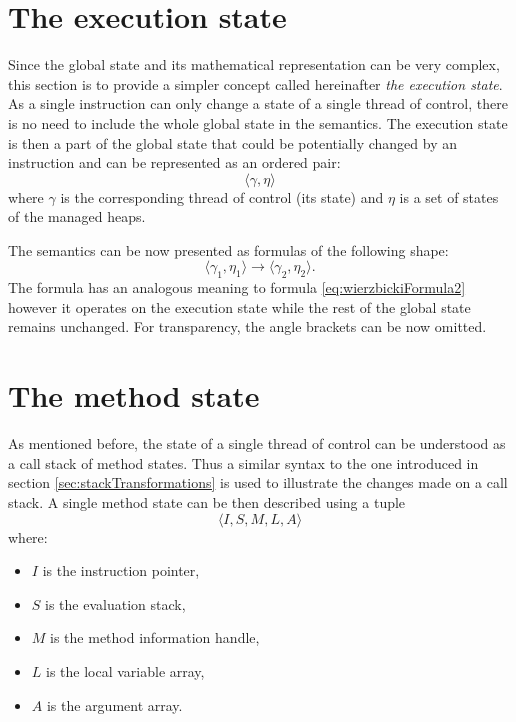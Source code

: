 \documentclass[declaration,shortabstract,english,mgr]{iithesis}
\newcommand{\mstate}[5] {
	\langle#1, #2, #3, #4, #5\rangle
}
\begin{document}
\section{The execution state}
\label{sec:executionState}

Since the global state and its mathematical representation can be very complex, this section is to provide a simpler concept called hereinafter \textit{the execution state}. As a single instruction can only change a state of a single thread of control, there is no need to include the whole global state in the semantics. The execution state is then a part of the global state that could be potentially changed by an instruction and can be represented as an ordered pair:
\begin{equation}
\label{eq:executionState}
	\langle\gamma, \eta\rangle
\end{equation}
where $\gamma$ is the corresponding thread of control (its state) and $\eta$ is a set of states of the managed heaps.

The semantics can be now presented as formulas of the following shape:
\begin{equation}
\label{eq:simpleSemantics}
	\langle\gamma_1, \eta_1\rangle \rightarrow \langle\gamma_2, \eta_2\rangle.
\end{equation}
The formula has an analogous meaning to formula \ref{eq:wierzbickiFormula2} however it operates on the execution state while the rest of the global state remains unchanged. For transparency, the angle brackets can be now omitted.

\section{The method state}

As mentioned before, the state of a single thread of control can be understood as a call stack of method states. Thus a similar syntax to the one introduced in section \ref{sec:stackTransformations} is used to illustrate the changes made on a call stack. A single method state can be then described using a tuple
\begin{equation}
\label{eq:methodState}
	\mstate{I}{S}{M}{L}{A}
\end{equation}
where:
\begin{itemize}
	\item{$I$ is the instruction pointer},
	\item{$S$ is the evaluation stack},
	\item{$M$ is the method information handle},
	\item{$L$ is the local variable array},
	\item{$A$ is the argument array}.
\end{itemize}
\end{document}
